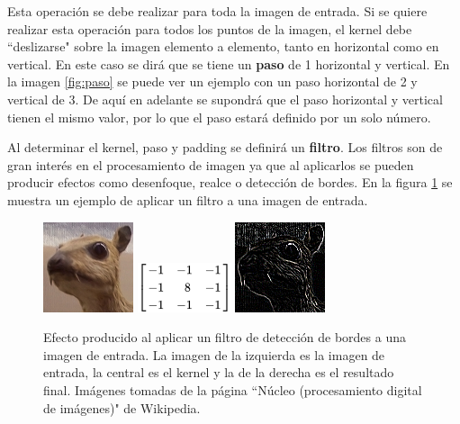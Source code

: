 
Esta operación se debe realizar para toda la imagen de entrada. Si se quiere realizar esta operación para todos los puntos de la imagen, el kernel debe ``deslizarse" sobre la imagen elemento a elemento, tanto en horizontal como en vertical. En este caso se dirá que se tiene un \textbf{paso} de 1 horizontal y vertical. En la imagen \ref{fig:paso} \cite{paddingandstride} se puede ver un ejemplo con un paso horizontal de 2 y vertical de 3. De aquí en adelante se supondrá que el paso horizontal y vertical tienen el mismo valor, por lo que el paso estará definido por un solo número.


Al determinar el kernel, paso y padding se definirá un \textbf{filtro}. Los filtros son de gran interés en el procesamiento de imagen ya que al aplicarlos se pueden producir efectos como desenfoque, realce o detección de bordes. En la figura \ref{fig:filtro} \cite{Wikipedia2020} se muestra un ejemplo de aplicar un filtro a una imagen de entrada.

\begin{figure}[ht]
\centering
\includegraphics[scale=2]{img/filter_og.png}
\includegraphics[scale=1]{img/filter_edge_kernel.png}
\includegraphics[scale=2]{img/filter_edge.png}
\caption[Resultado de aplicar un filtro de reconocimiento de bordes a una imagen.]{Efecto producido al aplicar un filtro de detección de bordes a una imagen de entrada. La imagen de la izquierda es la imagen de entrada, la central es el kernel y la de la derecha es el resultado final. Imágenes tomadas de la página ``Núcleo (procesamiento digital de imágenes)"\phantom{x} de Wikipedia.}\bigskip
\label{fig:filtro}
\end{figure}

